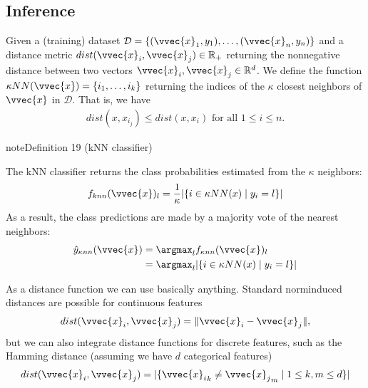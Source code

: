 \documentclass[letterpaper,10pt,english]{jupyterBook}
\begin{document}
\subsection{Inference}
\label{\detokenize{classification_knn:inference}}
\sphinxAtStartPar
Given a (training) dataset \(\mathcal{D}=\{(\vvec{x}_1,y_1),\ldots, (\vvec{x}_n,y_n)\}\) and a distance metric \(dist(\vvec{x}_i,\vvec{x}_j)\in\mathbb{R}_+\) returning the nonnegative distance between two vectors \(\vvec{x}_i,\vvec{x}_j\in\mathbb{R}^d\). We define the function \(\kappa NN(\vvec{x})=\{i_1,\ldots, i_k\}\) returning the indices of the \(\kappa\) closest neighbors of \(\vvec{x}\) in \(\mathcal{D}\). That is, we have
\begin{equation*}
\begin{split}dist(x,x_{i_j})\leq dist(x,x_i) \text{ for all } 1\leq i\leq n.\end{split}
\end{equation*}
\label{classification_knn:definition-0}
\begin{sphinxadmonition}{note}{Definition 19 (kNN classifier)}



\sphinxAtStartPar
The kNN classifier returns the class probabilities estimated from the \(\kappa\) neighbors:
\begin{align*}
f_{knn}(\vvec{x})_l = \frac{1}{\kappa} \lvert\{i\in \kappa NN(x)\mid y_i=l\}\rvert    
\end{align*}
\sphinxAtStartPar
As a result, the class predictions are made by a majority vote of the nearest neighbors:
\begin{align*}
\hat{y}_{\kappa nn}(\vvec{x}) &= \argmax_l f_{\kappa nn}(\vvec{x})_l\\
&= \argmax_l \lvert\{i\in \kappa NN(x)\mid y_i=l\}\rvert 
\end{align*}\end{sphinxadmonition}

\sphinxAtStartPar
As a distance function we can use basically anything. Standard norm\sphinxhyphen{}induced distances are possible for continuous features
\begin{equation*}
\begin{split}dist(\vvec{x}_i,\vvec{x}_j)=\lVert \vvec{x}_i - \vvec{x}_j\rVert,\end{split}
\end{equation*}
but we can also integrate distance functions for discrete features, such as the Hamming distance (assuming we have \(d\) categorical features)
\begin{equation*}
\begin{split}dist(\vvec{x}_i,\vvec{x}_j) = \lvert \{{\vvec{x}_i}_k\neq {\vvec{x}_j}_m\mid 1\leq k,m\leq d\}\rvert\end{split}
\end{equation*}
\end{document}
